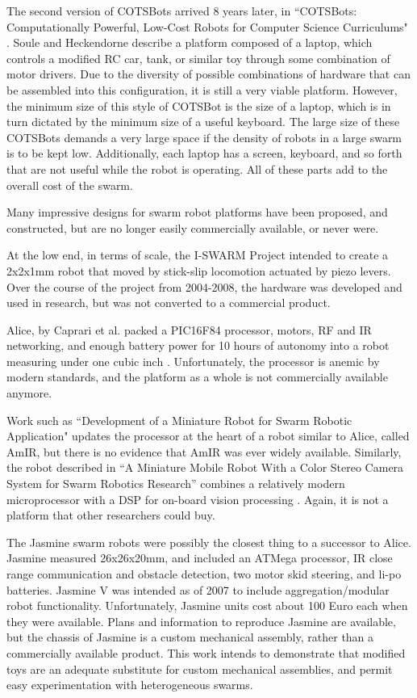 \documentclass[]{article}
\begin{document}
The second version of COTSBots arrived 8 years later, in ``COTSBots: Computationally Powerful, Low-Cost Robots for Computer Science Curriculums" \cite{soule2011cotsbots}. Soule and Heckendorne describe a platform composed of a laptop, which controls a modified RC car, tank, or similar toy through some combination of motor drivers. 
Due to the diversity of possible combinations of hardware that can be assembled into this configuration, it is still a very viable platform. 
However, the minimum size of this style of COTSBot is the size of a laptop, which is in turn dictated by the minimum size of a useful keyboard. 
The large size of these COTSBots demands a very large space if the density of robots in a large swarm is to be kept low. 
Additionally, each laptop has a screen, keyboard, and so forth that are not useful while the robot is operating. 
All of these parts add to the overall cost of the swarm. 

Many impressive designs for swarm robot platforms have been proposed, and constructed, but are no longer easily commercially available, or never were. 

At the low end, in terms of scale, the I-SWARM Project intended to create a 2x2x1mm robot that moved by stick-slip locomotion actuated by piezo levers\cite{seyfried2005swarm}. Over the course of the project from 2004-2008, the hardware was developed and used in research, but was not converted to a commercial product. 

Alice, by Caprari et al. packed a PIC16F84 processor, motors, RF and IR networking, and enough battery power for 10 hours of autonomy into a robot measuring under one cubic inch \cite{caprari1998autonomous}. Unfortunately, the processor is anemic by modern standards, and the platform as a whole is not commercially available anymore.

Work such as ``Development of a Miniature Robot for Swarm Robotic Application" updates the processor at the heart of a robot similar to Alice, called AmIR, but there is no evidence that AmIR was ever widely available\cite{arvin2009development}. Similarly, the robot described in ``A Miniature Mobile Robot With a Color Stereo Camera System for Swarm Robotics Research'' combines a relatively modern microprocessor with a DSP for on-board vision processing \cite{haverinen2005miniature}. Again, it is not a platform that other researchers could buy.

The Jasmine swarm robots were possibly the closest thing to a successor to Alice.
Jasmine measured 26x26x20mm, and included an ATMega processor, IR close range communication and obstacle detection, two motor skid steering, and li-po batteries.
Jasmine V was intended as of 2007 to include aggregation/modular robot functionality.  Unfortunately, Jasmine units cost about 100 Euro each when they were available. 
Plans and information to reproduce Jasmine are available, but the chassis of Jasmine is a custom mechanical assembly, rather than a commercially available product. 
This work intends to demonstrate that modified toys are an adequate substitute for custom mechanical assemblies, and permit easy experimentation with heterogeneous swarms. 
\end{document}
